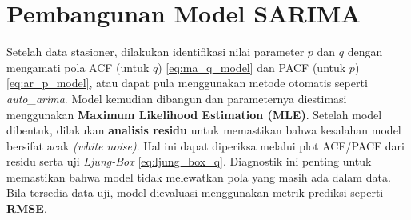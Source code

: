 \section{Pembangunan Model SARIMA}
Setelah data stasioner, dilakukan identifikasi nilai parameter $p$ dan $q$ dengan mengamati pola ACF (untuk $q$) \ref{eq:ma_q_model} dan PACF (untuk $p$) \ref{eq:ar_p_model}, atau dapat pula menggunakan metode otomatis seperti \textit{auto\_arima}. Model kemudian dibangun dan parameternya diestimasi menggunakan \textbf{Maximum Likelihood Estimation (MLE)}. Setelah model dibentuk, dilakukan \textbf{analisis residu} untuk memastikan bahwa kesalahan model bersifat acak \textit{(white noise)}. Hal ini dapat diperiksa melalui plot ACF/PACF dari residu serta uji \textit{Ljung-Box} \ref{eq:ljung_box_q}. Diagnostik ini penting untuk memastikan bahwa model tidak melewatkan pola yang masih ada dalam data. Bila tersedia data uji, model dievaluasi menggunakan metrik prediksi seperti \textbf{RMSE}.